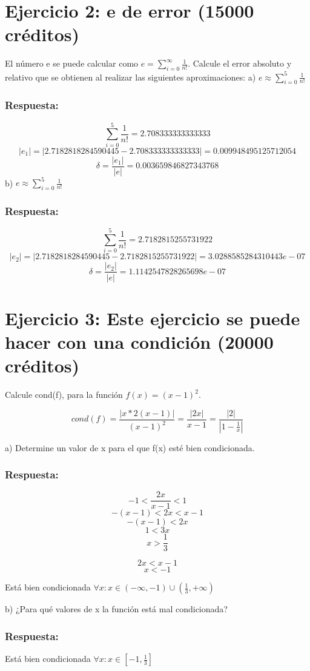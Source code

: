 \documentclass{article}
\begin{document}
\section{ Ejercicio 2: e de error (15000 créditos)}
El número e se puede calcular como $ e = \sum^{\infty}_{i=0} \frac{1}{n!}$. Calcule el error absoluto y relativo que se obtienen al realizar las siguientes aproximaciones: a) $ e \approx \sum_{i=0}^{5}\frac{1}{n!}$ 
\subsubsection{ Respuesta:}
$$ \sum_{i=0}^{5}\frac{1}{n!} = 2.708333333333333 $$ $$ |e_{1}| = |2.7182818284590445 - 2.708333333333333| = 0.009948495125712054 $$ $$ \delta = \frac{|e_{1}|}{|e|} =  0.003659846827343768 $$ b) $ e \approx \sum_{i=0}^{5}\frac{1}{n!}$ 
\subsubsection{ Respuesta:}
$$ \sum_{i=0}^{5}\frac{1}{n!} = 2.7182815255731922 $$ $$ |e_{2}| = |2.7182818284590445 - 2.7182815255731922 | = 3.0288585284310443e-07 $$ $$ \delta = \frac{|e_{2}|}{|e|} = 1.1142547828265698e-07 $$
\section{ Ejercicio 3: Este ejercicio se puede hacer con una condición (20000 créditos)}
Calcule cond(f), para la función $ f(x) = (x − 1)^2$.

$$ cond(f) = \frac{|x * 2(x-1)|}{(x-1)^{2}} = \frac{|2x|}{x-1} = \frac{|2|}{|1-\frac{1}{x}|}$$

a) Determine un valor de x para el que f(x) esté bien condicionada.


\subsubsection{ Respuesta:}
$$ -1 < \frac{2x}{x-1} < 1 $$ $$ -(x-1) < 2x < x-1 $$ $$ -(x-1) < 2x $$ $$ 1 < 3x $$ $$ x > \frac{1}{3} $$

$$ 2x < x-1 $$ $$ x < -1 $$

Está bien condicionada $ \forall x : x \in (-\infty,-1) \cup (\frac{1}{3}, +\infty)$

b) ¿Para qué valores de x la función está mal condicionada? 
\subsubsection{ Respuesta:}
Está bien condicionada $ \forall x : x \in [-1,\frac{1}{3}]$
\end{document}
